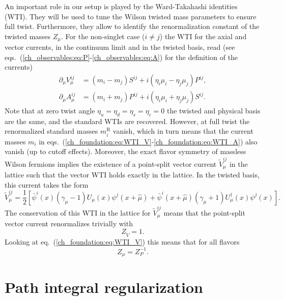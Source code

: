 An important role in our setup is played by the Ward-Takahashi identities (WTI). They will be used to tune the Wilson twisted mass parameters to ensure full twist. Furthermore, they allow to identify the renormalization constant of the twisted masses $Z_{\mu}$. For the non-singlet case ($i\neq j$) the WTI for the axial and vector currents, in the continuum limit and in the twisted basis, read (see eqs.~(\ref{ch_observables:eq:P}-\ref{ch_observables:eq:A}) for the definition of the currents)
\begin{align}
\label{ch_foundation:eq:WTI_V}
\partial_{\mu}V_{\mu}^{ij}&=(m_i-m_j)S^{ij}+i(\eta_i\mu_i-\eta_j\mu_j)P^{ij},\\
\label{ch_foundation:eq:WTI_A}
\partial_{\mu}A_{\mu}^{ij}&=(m_i+m_j)P^{ij}+i(\eta_i\mu_i+\eta_j\mu_j)S^{ij}.
\end{align}
Note that at zero twist angle $\eta_u=\eta_d=\eta_s=\eta_c=0$ the twisted and physical basis are the same, and the standard WTIs are recovered. However, at full twist the renormalized standard masses $m_i^{\textrm{R}}$ vanish, which in turn means that the current masses $m_{i}$ in eqs.~(\ref{ch_foundation:eq:WTI_V}-\ref{ch_foundation:eq:WTI_A}) also vanish (up to cutoff effects). Moreover, the exact flavor symmetry of massless Wilson fermions implies the existence of a point-split vector current $\tilde{V}_{\mu}^{ij}$ in the lattice such that the vector WTI holds exactly in the lattice. In the twisted basis, this current takes the form
\begin{equation}
\tilde{V}_{\mu}^{ij}=\frac{1}{2}\left[\bar{\psi}^i(x)(\gamma_{\mu}-1)U_{\mu}(x)\psi^j(x+\hat{\mu})+\bar{\psi}^i(x+\hat{\mu})(\gamma_{\mu}+1)U_{\mu}^{\dagger}(x)\psi^j(x)\right].
\end{equation}
The conservation of this WTI in the lattice for $\tilde{V}_{\mu}^{ij}$ means that the point-split vector current renormalizes trivially with
\begin{equation}
\label{ch_foundation:eq:ZV=1}
Z_{\tilde{V}}=1.
\end{equation}
Looking at eq.~(\ref{ch_foundation:eq:WTI_V}) this means that for all flavors
\begin{equation}
\label{ch_foundation:eq:Zmu}
Z_{\mu}=Z_P^{-1}.
\end{equation}



\section{Path integral regularization}
\label{ch_foundation:sec:path}

